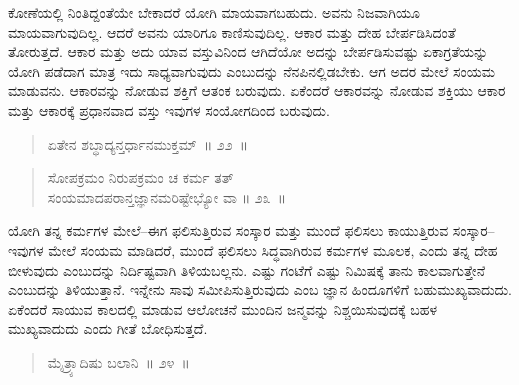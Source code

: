 \vspace{-0.35cm}


ಕೋಣೆಯಲ್ಲಿ ನಿಂತಿದ್ದಂತೆಯೇ ಬೇಕಾದರೆ ಯೋಗಿ ಮಾಯವಾಗಬಹುದು. ಅವನು ನಿಜವಾಗಿಯೂ ಮಾಯವಾಗುವುದಿಲ್ಲ. ಆದರೆ ಅವನು ಯಾರಿಗೂ ಕಾಣಿಸುವುದಿಲ್ಲ. ಆಕಾರ ಮತ್ತು ದೇಹ ಬೇರ್ಪಡಿಸಿದಂತೆ ತೋರುತ್ತದೆ. ಆಕಾರ ಮತ್ತು ಅದು ಯಾವ ವಸ್ತುವಿನಿಂದ ಆಗಿದೆಯೋ ಅದನ್ನು ಬೇರ್ಪಡಿಸುವಷ್ಟು ಏಕಾಗ್ರತೆಯನ್ನು ಯೋಗಿ ಪಡೆದಾಗ ಮಾತ್ರ ಇದು ಸಾಧ್ಯವಾಗುವುದು ಎಂಬುದನ್ನು ನೆನಪಿನಲ್ಲಿಡಬೇಕು. ಆಗ ಅದರ ಮೇಲೆ ಸಂಯಮ ಮಾಡುವನು. ಆಕಾರವನ್ನು ನೋಡುವ ಶಕ್ತಿಗೆ ಆತಂಕ ಬರುವುದು. ಏಕೆಂದರೆ ಆಕಾರವನ್ನು ನೋಡುವ ಶಕ್ತಿಯು ಆಕಾರ ಮತ್ತು ಆಕಾರಕ್ಕೆ ಪ್ರಧಾನವಾದ ವಸ್ತು ಇವುಗಳ ಸಂಯೋಗದಿಂದ ಬರುವುದು. 

\vspace{-0.3cm}

\begin{verse}
ಏತೇನ ಶಬ್ಧಾದ್ಯನ್ತರ್ಧಾನಮುಕ್ತಮ್​~॥ ೨೨~॥
\end{verse}

\vspace{-0.35cm}


\vspace{-0.3cm}

\begin{verse}
ಸೋಪಕ್ರಮಂ ನಿರುಪಕ್ರಮಂ ಚ ಕರ್ಮ ತತ್​\\ಸಂಯಮಾದಪರಾನ್ತಜ್ಞಾನಮರಿಷ್ಟೇಭ್ಯೋ ವಾ \hfill{॥ ೨೩~॥}
\end{verse}

\vspace{-0.3cm}


ಯೋಗಿ ತನ್ನ ಕರ್ಮಗಳ ಮೇಲೆ–ಈಗ ಫಲಿಸುತ್ತಿರುವ ಸಂಸ್ಕಾರ ಮತ್ತು ಮುಂದೆ ಫಲಿಸಲು ಕಾಯುತ್ತಿರುವ ಸಂಸ್ಕಾರ–ಇವುಗಳ ಮೇಲೆ ಸಂಯಮ ಮಾಡಿದರೆ, ಮುಂದೆ ಫಲಿಸಲು ಸಿದ್ಧವಾಗಿರುವ ಕರ್ಮಗಳ ಮೂಲಕ, ಎಂದು ತನ್ನ ದೇಹ ಬೀಳುವುದು ಎಂಬುದನ್ನು ನಿರ್ದಿಷ್ಟವಾಗಿ ತಿಳಿಯಬಲ್ಲನು. ಎಷ್ಟು ಗಂಟೆಗೆ ಎಷ್ಟು ನಿಮಿಷಕ್ಕೆ ತಾನು ಕಾಲವಾಗುತ್ತೇನೆ ಎಂಬುದನ್ನು ತಿಳಿಯುತ್ತಾನೆ. ಇನ್ನೇನು ಸಾವು ಸಮೀಪಿಸುತ್ತಿರುವುದು ಎಂಬ ಜ್ಞಾನ ಹಿಂದೂಗಳಿಗೆ ಬಹುಮುಖ್ಯವಾದುದು. ಏಕೆಂದರೆ ಸಾಯುವ ಕಾಲದಲ್ಲಿ ಮಾಡುವ ಆಲೋಚನೆ ಮುಂದಿನ ಜನ್ಮವನ್ನು ನಿಶ್ಚಯಿಸುವುದಕ್ಕೆ ಬಹಳ ಮುಖ್ಯವಾದುದು ಎಂದು ಗೀತೆ ಬೋಧಿಸುತ್ತದೆ. 

\vspace{-0.3cm}

\begin{verse}
ಮೈತ್ರ್ಯಾದಿಷು ಬಲಾನಿ~॥ ೨೪~॥
\end{verse}

